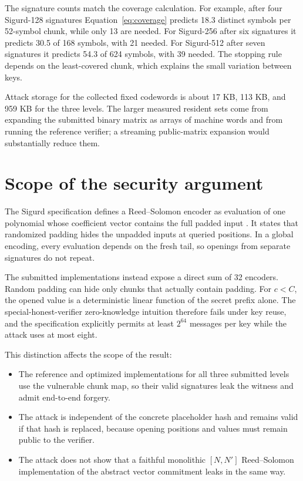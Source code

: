 \documentclass[11pt,a4paper]{article}
\begin{document}
The signature counts match the coverage calculation.  For example, after four
Sigurd-128 signatures Equation~\eqref{eq:coverage} predicts 18.3 distinct
symbols per 52-symbol chunk, while only 13 are needed.  For Sigurd-256 after
six signatures it predicts 30.5 of 168 symbols, with 21 needed.  For
Sigurd-512 after seven signatures it predicts 54.3 of 624 symbols, with 39
needed.  The stopping rule depends on the least-covered chunk, which explains
the small variation between keys.

Attack storage for the collected fixed codewords is about 17 KB, 113 KB, and
959 KB for the three levels.  The larger measured resident sets come from
expanding the submitted binary matrix as arrays of machine words and from
running the reference verifier; a streaming public-matrix expansion would
substantially reduce them.

\section{Scope of the security argument}
\label{sec:scope}

The Sigurd specification defines a Reed--Solomon encoder as evaluation of one
polynomial whose coefficient vector contains the full padded input
\cite[Sec.~2.5 and Sec.~4.1]{Sigurd}.  It states that randomized padding hides
the unpadded inputs at queried positions.  In a global encoding, every
evaluation depends on the fresh tail, so openings from separate signatures do
not repeat.

The submitted implementations instead expose a direct sum of 32 encoders.
Random padding can hide only chunks that actually contain padding.  For
$c<C$, the opened value is a deterministic linear function of the secret
prefix alone.  The special-honest-verifier zero-knowledge intuition therefore
fails under key reuse, and the specification explicitly permits at least
$2^{64}$ messages per key while the attack uses at most eight.

This distinction affects the scope of the result:

\begin{itemize}[leftmargin=1.5em]
  \item The reference and optimized implementations for all three submitted
        levels use the vulnerable chunk map, so their valid signatures leak
        the witness and admit end-to-end forgery.
  \item The attack is independent of the concrete placeholder hash and remains
        valid if that hash is replaced, because opening positions and values
        must remain public to the verifier.
  \item The attack does not show that a faithful monolithic $[N,N']$
        Reed--Solomon implementation of the abstract vector commitment leaks
        in the same way.
\end{itemize}
\end{document}
